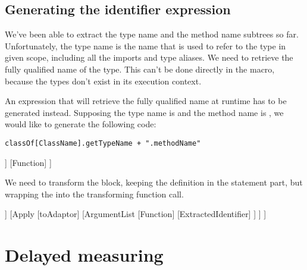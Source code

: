 \subsection{Generating the identifier expression}

We've been able to extract the type name and the method name subtrees so far. Unfortunately, the type name is the name that is used to refer to the type in given scope, including all the imports and type aliases. We need to retrieve the fully qualified name of the type. This can't be done directly in the macro, because the types don't exist in its execution context.

An expression that will retrieve the fully qualified name at runtime has to be generated instead. Supposing the type name is  and the method name is , we would like to generate the following code:

\lstset{style=Scala}
\begin{lstlisting}
classOf[ClassName].getTypeName + ".methodName"
\end{lstlisting}



\begin{forest}
	[Block
	  [Statements
	    [ValDef]
	  ]
	  [Function]
	]
\end{forest}

We need to transform the block, keeping the definition in the statement part, but wrapping the  into the transforming function call.
	
\begin{forest}
	[Block
	[Statements
	[ValDef]
	]
	[Apply
	  [toAdaptor]
	  [ArgumentList
	    [Function]
	    [ExtractedIdentifier]
	  ]
	]
	]
\end{forest}
	
\section{Delayed measuring}


